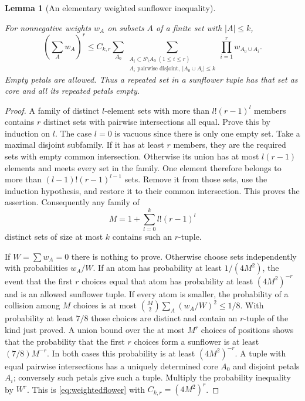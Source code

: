 \documentclass[11pt,oneside]{article}
\newtheorem{lemma}[theorem]{Lemma}
\theoremstyle{definition}\newtheorem{definition}[theorem]{Definition}
\theoremstyle{remark}\newtheorem{remark}[theorem]{Remark}
\newcommand{\bp}[1]{\leavevmode\par\nobreak\noindent{\normalfont\small\sffamily Blueprint identifier: \texttt{#1}.}\par\nobreak}
\begin{document}
\begin{lemma}[An elementary weighted sunflower inequality]\label{lem:sunflower}
\bp{weighted\_sunflower}
For nonnegative weights $w_A$ on subsets $A$ of a finite set with $|A|\leq k$,
\begin{equation}\label{eq:weightedflower}
 \left(\sum_A w_A\right)^r
 \leq C_{k,r}\sum_{A_0}
 \sum_{\substack{A_i\subset S\setminus A_0\ (1\leq i\leq r)\\
                   A_i\text{ pairwise disjoint},\ |A_0\cup A_i|\leq k}}
                  \prod_{i=1}^r w_{A_0\cup A_i}.
\end{equation}
Empty petals are allowed. Thus a repeated set in a sunflower tuple has that
set as core and all its repeated petals empty.
\end{lemma}
\begin{proof}
A family of distinct $l$-element sets with more than $l!(r-1)^l$ members
contains $r$ distinct sets with pairwise intersections all equal. Prove this
by induction on $l$. The case $l=0$ is vacuous since there is only one empty
set. Take a maximal disjoint subfamily. If it has at least $r$ members, they
are the required sets with empty common intersection. Otherwise its union
has at most $l(r-1)$ elements and meets every set in the family. One element
therefore belongs to more than $(l-1)!(r-1)^{l-1}$ sets. Remove it from those
sets, use the induction hypothesis, and restore it to their common
intersection. This proves the assertion. Consequently any family of
\[
 M=1+\sum_{l=0}^k l!(r-1)^l
\]
distinct sets of size at most $k$ contains such an $r$-tuple.

If $W=\sum w_A=0$ there is nothing to prove. Otherwise choose sets independently
with probabilities $w_A/W$. If an atom has probability at least
$1/(4M^2)$, the event that the first $r$ choices equal that atom has probability
at least $(4M^2)^{-r}$ and is an allowed sunflower tuple. If every atom is
smaller, the probability of a collision among $M$ choices is at most
$\binom M2\sum_A(w_A/W)^2\leq1/8$.
With probability at least $7/8$ those choices are distinct and contain an
$r$-tuple of the kind just proved. A union bound over the at most $M^r$
choices of positions shows that the probability that the first $r$ choices
form a sunflower is at least $(7/8)M^{-r}$. In both cases this probability
is at least $(4M^2)^{-r}$.
A tuple with equal pairwise intersections has a uniquely determined core
$A_0$ and disjoint petals $A_i$; conversely such petals give such a tuple.
Multiply the probability inequality by $W^r$. This is
\eqref{eq:weightedflower} with $C_{k,r}=(4M^2)^r$.
\end{proof}
\end{document}
